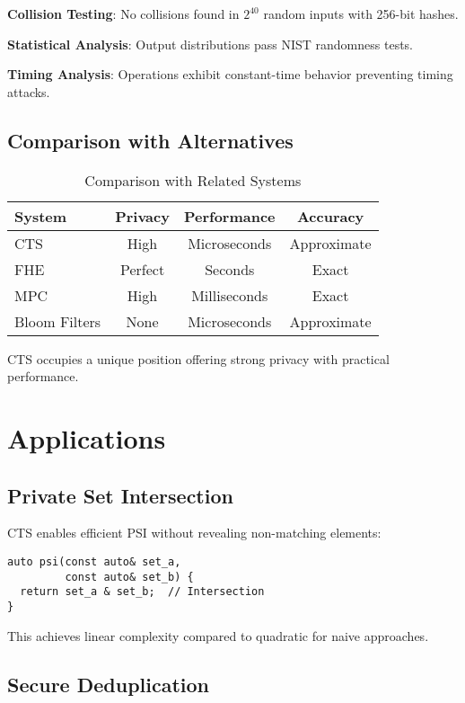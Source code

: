 \documentclass[10pt,conference]{IEEEtran}
\begin{document}
\textbf{Collision Testing}: No collisions found in $2^{40}$ random inputs with 256-bit hashes.

\textbf{Statistical Analysis}: Output distributions pass NIST randomness tests.

\textbf{Timing Analysis}: Operations exhibit constant-time behavior preventing timing attacks.

\subsection{Comparison with Alternatives}

\begin{table}[h]
\centering
\caption{Comparison with Related Systems}
\label{tab:comparison}
\begin{tabular}{lccc}
\toprule
System & Privacy & Performance & Accuracy \\
\midrule
CTS & High & Microseconds & Approximate \\
FHE & Perfect & Seconds & Exact \\
MPC & High & Milliseconds & Exact \\
Bloom Filters & None & Microseconds & Approximate \\
\bottomrule
\end{tabular}
\end{table}

CTS occupies a unique position offering strong privacy with practical performance.

\section{Applications}
\label{sec:applications}

\subsection{Private Set Intersection}

CTS enables efficient PSI without revealing non-matching elements:

\begin{lstlisting}
auto psi(const auto& set_a,
         const auto& set_b) {
  return set_a & set_b;  // Intersection
}
\end{lstlisting}

This achieves linear complexity compared to quadratic for naive approaches.

\subsection{Secure Deduplication}
\end{document}
